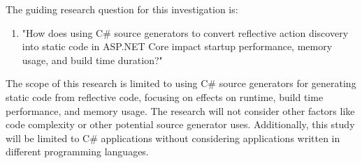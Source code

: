The guiding research question for this investigation is:

\begin{enumerate}[label=\textbf{RQ.\arabic*}:, leftmargin=*, labelindent=1em]
    \item "How does using C\# source generators to convert reflective action discovery into static code in ASP.NET Core impact startup performance, memory usage, and build time duration?"
\end{enumerate}

The scope of this research is limited to using C\# source generators for generating static code from reflective code, focusing on effects on runtime, build time performance, and memory usage. The research will not consider other factors like code complexity or other potential source generator uses. Additionally, this study will be limited to C\# applications without considering applications written in different programming languages.
